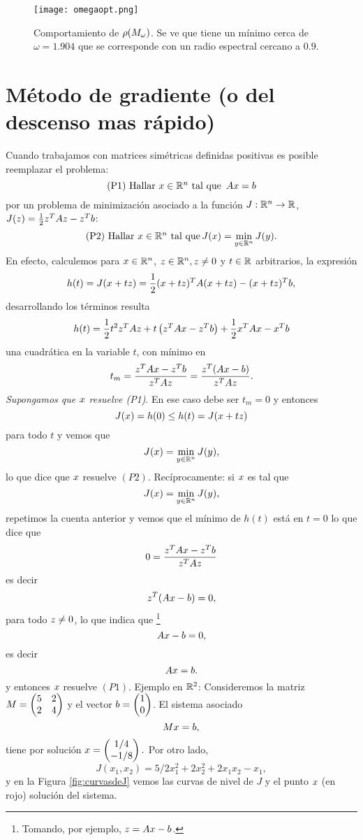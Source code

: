 \begin{figure}[h]
\label{fig:omegasSor}
\centering\texttt{[image: omegaopt.png]}
\caption{Comportamiento de $\rho(\Mb_\omega)$. Se ve que tiene un mínimo cerca de $\omega=1.904$ que se corresponde con un radio espectral cercano a $0.9$. }
\end{figure}

\section{Método de gradiente (o del descenso mas rápido)}
Cuando trabajamos con matrices simétricas definidas positivas es posible reemplazar el problema:
$$
\mbox{(P1) Hallar $\xb\in \R^n$ tal que
}\,\Ab\xb=\bb
$$
por un problema de minimización  asociado a la función  $J:\mathbb R^{n}\to \mathbb R$, $J(\zb)=\frac{1}{2}\zb^T\Ab\zb-\zb^T\bb$:
$$
\mbox{(P2) Hallar $\xb\in \Rn$ tal que}\, J(\xb)=
\min_{\yb\in \R^n}J(\yb).
$$
En efecto, calculemos para $\xb\in \Rn$, $\zb\in \Rn, \zb\ne\cero$ y $t\in \mathbb R$ arbitrarios, la expresión
$$
h(t)=J(\xb+t\zb)= \frac{1}{2}(\xb+t\zb)^T\Ab(\xb+t\zb)-(\xb+t\zb)^T\bb,
$$
desarrollando los términos resulta
\begin{equation}
\label{eq:derideh}
h(t)=\frac{1}{2}t^2\zb^T\Ab\zb+t\left(\zb^T\Ab\xb-\zb^T\bb\right) +\frac{1}{2}\xb^T\Ab\xb-\xb^T\bb
\end{equation}
una cuadr\'atica en la variable $t$, con mínimo en
\begin{equation}
\label{eq:minsearch}
t_m=\frac{\zb^T\Ab\xb-\zb^T\bb}{\zb^T\Ab\zb}=\frac{\zb^T(\Ab\xb-\bb)}{\zb^T\Ab\zb}.
\end{equation}
\emph{Supongamos que $\xb$ resuelve (P1)}. En ese caso debe ser $t_m=0$ y entonces
$$
J(\xb)=h(0)\le h(t)=J(\xb+t\zb)
$$
para todo $t$ y vemos que  
$$
J(\xb)=\min_{\yb\in\Rn}J(\yb),
$$
lo que dice que $\xb$ resuelve $(P2)$.
Recíprocamente: si $\xb$ es tal que 
$$
J(\xb)=\min_{\yb\in\Rn}J(\yb),
$$
repetimos la cuenta anterior y vemos que el mínimo de $h(t)$ está en $t=0$ lo que dice que
$$0=\frac{\zb^T\Ab\xb-\zb^T\bb}{\zb^T\Ab\zb}
$$
es decir
$$
\zb^T(\Ab\xb-\bb)=0,
$$
para todo $\zb\neq \cero$, lo que indica que \footnote{Tomando, por ejemplo, $\zb=\Ab\xb-\bb$.}
$$
\Ab\xb-\bb=\cero,
$$
es decir
$$
\Ab\xb=\bb.
 $$
 y entonces $\xb$ resuelve $(P1)$.
\tcc
Ejemplo en $\mathbb R^2$: Consideremos la matriz $
\Mb=\begin{pmatrix}
     5&2\\
     2&4
    \end{pmatrix}
$ y el vector  $
\bb=\begin{pmatrix}
     1\\
     0
    \end{pmatrix}
$. El sistema asociado
$$
\Mb\xb=\bb,
$$
tiene por solución $\xb=\begin{pmatrix}
    1/4\\
    -1/8
     \end{pmatrix}.
$
Por otro lado, 
$$
J(x_1,x_2)=5/2x_1^2+2x_2^2+2x_1x_2-x_1,
$$
y en la Figura \ref{fig:curvasdeJ} vemos las curvas de nivel de $J$ y el punto $\xb$ (en rojo) solución del sistema. 
\etcc

